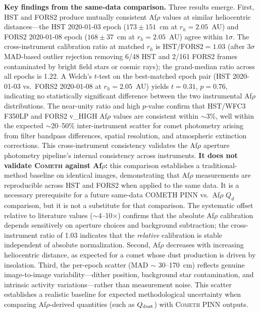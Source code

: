 \documentclass[usenatbib]{mnras}
\begin{document}
\textbf{Key findings from the same-data comparison.} Three results emerge. First, HST and FORS2 produce mutually consistent Af$\rho$ values at similar heliocentric distances---the HST 2020-01-03 epoch ($173\pm151$~cm at $r_h=2.05$~AU) and FORS2 2020-01-08 epoch ($168\pm37$~cm at $r_h=2.05$~AU) agree within $1\sigma$. The cross-instrument calibration ratio at matched $r_h$ is $\text{HST/FORS2} = 1.03$ (after $3\sigma$ MAD-based outlier rejection removing 6/48 HST and 2/161 FORS2 frames contaminated by bright field stars or cosmic rays); the grand-median ratio across all epochs is 1.22. A Welch's $t$-test on the best-matched epoch pair (HST 2020-01-03 vs.\ FORS2 2020-01-08 at $r_h=2.05$~AU) yields $t = 0.31$, $p = 0.76$, indicating no statistically significant difference between the two instrumental Af$\rho$ distributions. The near-unity ratio and high $p$-value confirm that HST/WFC3 F350LP and FORS2 v\_HIGH Af$\rho$ values are consistent within $\sim$3\%, well within the expected $\sim$20--50\% inter-instrument scatter for comet photometry arising from filter bandpass differences, spatial resolution, and atmospheric extinction corrections. This cross-instrument consistency validates the Af$\rho$ aperture photometry pipeline's internal consistency across instruments. \textbf{It does not validate \textsc{Cometh} against Af$\rho$:} this comparison establishes a traditional-method baseline on identical images, demonstrating that Af$\rho$ measurements are reproducible across HST and FORS2 when applied to the same data. It is a necessary prerequisite for a future same-data COMETH PINN vs.\ Af$\rho$ $Q_d$ comparison, but it is not a substitute for that comparison. The systematic offset relative to literature values ($\sim$4--10$\times$) confirms that the absolute Af$\rho$ calibration depends sensitively on aperture choices and background subtraction; the cross-instrument ratio of 1.03 indicates that the \textit{relative} calibration is stable independent of absolute normalization. Second, Af$\rho$ decreases with increasing heliocentric distance, as expected for a comet whose dust production is driven by insolation. Third, the per-epoch scatter (MAD $\sim$ 30--170~cm) reflects genuine image-to-image variability---dither position, background star contamination, and intrinsic activity variations---rather than measurement noise. This scatter establishes a realistic baseline for expected methodological uncertainty when comparing Af$\rho$-derived quantities (such as $Q_{\rm dust}$) with \textsc{Cometh} PINN outputs.
\end{document}
